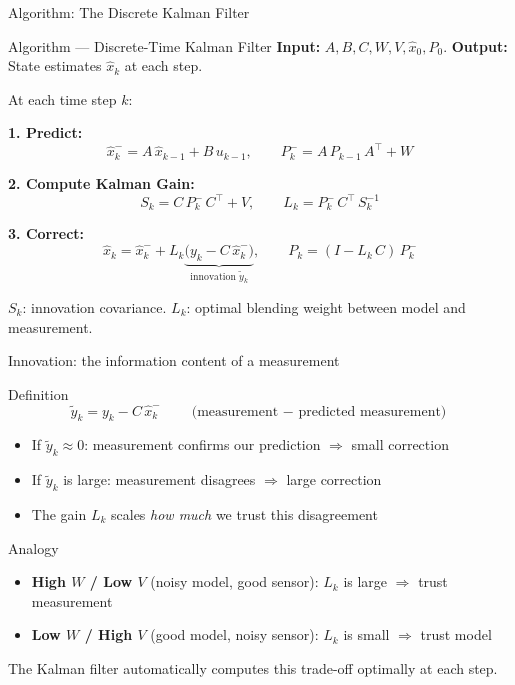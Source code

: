 \documentclass[aspectratio=169,11pt]{beamer}
\newcommand{\T}{\top}
\begin{document}
\begin{frame}[shrink=5]{Algorithm: The Discrete Kalman Filter}
\begin{block}{Algorithm --- Discrete-Time Kalman Filter}
\textbf{Input:} $A, B, C, W, V, \hat{x}_0, P_0$. \quad \textbf{Output:} State estimates $\hat{x}_k$ at each step.

\medskip
At each time step $k$:

\medskip
\textbf{1. Predict:}
\[
  \hat{x}_k^- = A\,\hat{x}_{k-1} + B\,u_{k-1}, \qquad
  P_k^- = A\,P_{k-1}\,A^\T + W
\]

\textbf{2. Compute Kalman Gain:}
\[
  S_k = C\,P_k^-\,C^\T + V, \qquad
  L_k = P_k^-\,C^\T\,S_k^{-1}
\]

\textbf{3. Correct:}
\[
  \hat{x}_k = \hat{x}_k^- + L_k\underbrace{\bigl(y_k - C\,\hat{x}_k^-\bigr)}_{\text{innovation } \tilde{y}_k}, \qquad
  P_k = (I - L_k\,C)\,P_k^-
\]
\end{block}

\smallskip
{\small $S_k$: innovation covariance. \; $L_k$: optimal blending weight between model and measurement.}
\end{frame}

\begin{frame}[shrink=3]{Innovation: the information content of a measurement}

\begin{block}{Definition}
\[
  \tilde{y}_k = y_k - C\,\hat{x}_k^- \qquad \text{(measurement $-$ predicted measurement)}
\]
\end{block}

\begin{itemize}
  \item If $\tilde{y}_k \approx 0$: measurement confirms our prediction $\Rightarrow$ small correction
  \item If $\tilde{y}_k$ is large: measurement disagrees $\Rightarrow$ large correction
  \item The gain $L_k$ scales \emph{how much} we trust this disagreement
\end{itemize}

\begin{exampleblock}{Analogy}
\begin{itemize}
  \item \textbf{High $W$ / Low $V$} (noisy model, good sensor): $L_k$ is large $\Rightarrow$ trust measurement
  \item \textbf{Low $W$ / High $V$} (good model, noisy sensor): $L_k$ is small $\Rightarrow$ trust model
\end{itemize}
The Kalman filter automatically computes this trade-off optimally at each step.
\end{exampleblock}
\end{frame}
\end{document}
